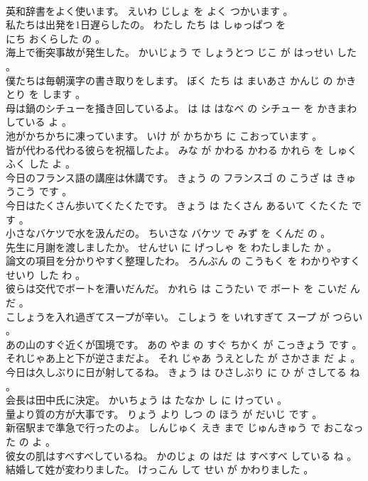 \documentclass[8pt]{extreport}
\begin{document}
\begin{CJK}{UTF8}{min}
\\	英和辞書をよく使います。	えいわ じしょ を よく つかいます 。 
\\	私たちは出発を1日遅らしたの。	わたし たち は しゅっぱつ を 
\\	にち おくらした の 。 
\\	海上で衝突事故が発生した。	かいじょう で しょうとつ じこ が はっせい した 。 
\\	僕たちは毎朝漢字の書き取りをします。	ぼく たち は まいあさ かんじ の かきとり を します 。 
\\	母は鍋のシチューを掻き回しているよ。	は は はなべ の シチュー を かきまわしている よ 。 
\\	池がかちかちに凍っています。	いけ が かちかち に こおっています 。 
\\	皆が代わる代わる彼らを祝福したよ。	みな が かわる かわる かれら を しゅくふく した よ 。 
\\	今日のフランス語の講座は休講です。	きょう の フランスゴ の こうざ は きゅうこう です 。 
\\	今日はたくさん歩いてくたくたです。	きょう は たくさん あるいて くたくた です 。 
\\	小さなバケツで水を汲んだの。	ちいさな バケツ で みず を くんだ の 。 
\\	先生に月謝を渡しましたか。	せんせい に げっしゃ を わたしました か 。 
\\	論文の項目を分かりやすく整理したわ。	ろんぶん の こうもく を わかりやすく せいり した わ 。 
\\	彼らは交代でボートを漕いだんだ。	かれら は こうたい で ボート を こいだ ん だ 。 
\\	こしょうを入れ過ぎてスープが辛い。	こしょう を いれすぎて スープ が つらい 。 
\\	あの山のすぐ近くが国境です。	あの やま の すぐ ちかく が こっきょう です 。 
\\	それじゃあ上と下が逆さまだよ。	それ じゃあ うえとした が さかさま だ よ 。 
\\	今日は久しぶりに日が射してるね。	きょう は ひさしぶり に ひ が さしてる ね 。 
\\	会長は田中氏に決定。	かいちょう は たなか し に けってい 。 
\\	量より質の方が大事です。	りょう より しつ の ほう が だいじ です 。 
\\	新宿駅まで準急で行ったのよ。	しんじゅく えき まで じゅんきゅう で おこなった の よ 。 
\\	彼女の肌はすべすべしているね。	かのじょ の はだ は すべすべ している ね 。 
\\	結婚して姓が変わりました。	けっこん して せい が かわりました 。 

\end{CJK}
\end{document}
